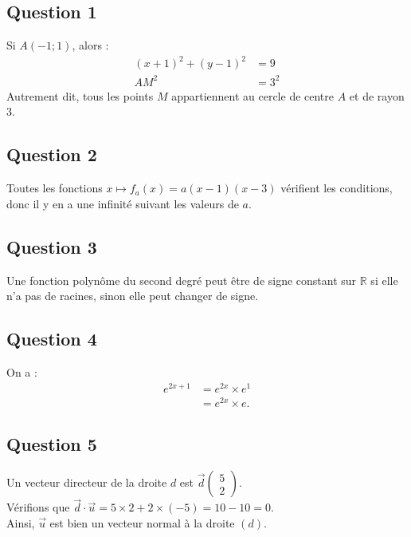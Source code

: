 \subsection*{Question 1}
	
	Si $A(-1 ; 1)$, alors :
	\begin{align*}
		(x+1)^2 + (y-1)^2 &= 9 \\
		AM^2 &= 3^2
	\end{align*}
	Autrement dit, tous les points $M$ appartiennent au cercle de centre $A$ et de rayon $3$.
	
	\subsection*{Question 2}
	
	Toutes les fonctions $x \mapsto f_a(x) = a(x -1)(x -3)$ vérifient les conditions, donc il y en a une infinité suivant les valeurs de $a$.
	
	\subsection*{Question 3}
	
	Une fonction polynôme du second degré peut être de signe constant sur $\mathbb{R}$ si elle n'a pas de racines, sinon elle peut changer de signe.
	
	\subsection*{Question 4}
	
	On a :
	\begin{align*}
		e^{2x+1} &= e^{2x} \times e^1 \\
		&= e^{2x} \times e.
	\end{align*}
	
	\subsection*{Question 5}
	
	Un vecteur directeur de la droite $d$ est $\overrightarrow{d}  \begin{pmatrix} 5 \\ 2 \end{pmatrix}$.\\
	Vérifions que $\overrightarrow{d} \cdot \overrightarrow{u} = 5 \times 2 + 2 \times (-5) = 10 - 10 = 0$.\\
	Ainsi, $\overrightarrow{u}$ est bien un vecteur normal à la droite $(d)$.
